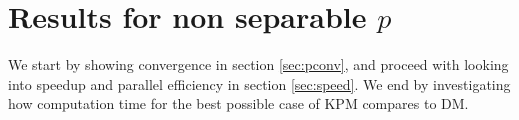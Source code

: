 \section{Results for non separable $p$} \label{sec:para}%
We start by showing convergence in section \ref{sec:pconv}, and proceed with looking into speedup and parallel efficiency in section \ref{sec:speed}. We end by investigating how computation time for the best possible case of KPM compares to DM. 

